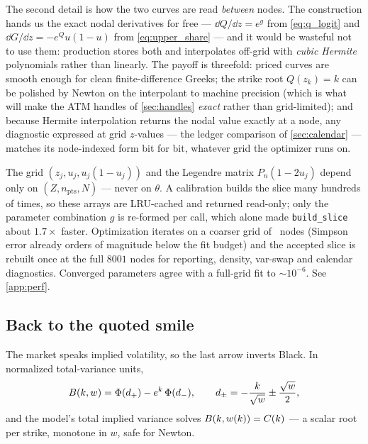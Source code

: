 \documentclass[11pt]{article}
\begin{document}
The second detail is how the two curves are read \emph{between} nodes.  The
construction hands us the exact nodal derivatives for free ---
$\dd Q/\dd z=e^{g}$ from \eqref{eq:q_logit} and $\dd G/\dd z=-e^{Q}u(1-u)$
from \eqref{eq:upper_share} --- and it would be wasteful not to use them:
production stores both and interpolates off-grid with \emph{cubic Hermite}
polynomials rather than linearly.  The payoff is threefold: priced curves
are smooth enough for clean finite-difference Greeks; the strike root
$Q(z_k)=k$ can be polished by Newton on the interpolant to machine
precision (which is what will make the ATM handles of \cref{sec:handles}
\emph{exact} rather than grid-limited); and because Hermite interpolation
returns the nodal value exactly at a node, any diagnostic expressed at grid
$z$-values --- the ledger comparison of \cref{sec:calendar} --- matches its
node-indexed form bit for bit, whatever grid the optimizer runs on.

\begin{perfbox}
The grid $(z_j,u_j,u_j(1-u_j))$ and the Legendre matrix $P_n(1-2u_j)$ depend
only on $(Z,n_{\text{pts}},N)$ --- never on $\theta$.  A calibration builds
the slice many hundreds of times, so these arrays are LRU-cached and returned
read-only; only the parameter combination $g$ is re-formed per call, which
alone made \texttt{build\_slice} about $1.7\times$ faster.  Optimization
iterates on a coarser grid of \lqdoptpts\ nodes (Simpson error already orders
of magnitude below the fit budget) and the accepted slice is rebuilt once at
the full $8001$ nodes for reporting, density, var-swap and calendar
diagnostics.  Converged parameters agree with a full-grid fit to
$\sim10^{-6}$.  See \cref{app:perf}.
\end{perfbox}

\subsection{Back to the quoted smile}
\label{sec:black}

The market speaks implied volatility, so the last arrow inverts Black.  In
normalized total-variance units,
\begin{equation}
B(k,w)=\Phi(d_+)-e^{k}\,\Phi(d_-),
\qquad
d_\pm=-\frac{k}{\sqrt w}\pm\frac{\sqrt w}{2},
\label{eq:black}
\end{equation}
and the model's total implied variance solves $B(k,w(k))=C(k)$ ---
a scalar root per strike, monotone in $w$, safe for Newton.
\end{document}
